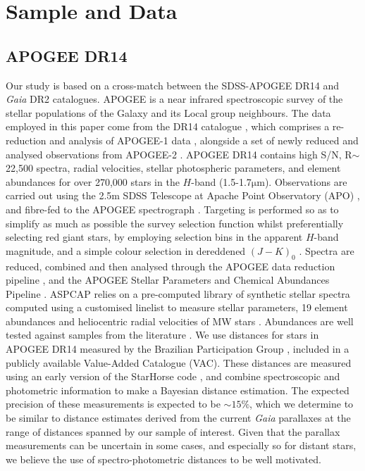 \section{Sample and Data} \label{data}
\subsection{APOGEE DR14}

Our study is based on a cross-match between the SDSS-APOGEE DR14
and \emph{Gaia} DR2 catalogues. APOGEE \citep{2015arXiv150905420M}
is a near infrared spectroscopic survey of the stellar populations
of the Galaxy and its Local group neighbours. The data employed in this paper
come from the DR14 catalogue \citep{2018ApJS..235...42A}, which
comprises a re-reduction and analysis of APOGEE-1 data \citep[from
SDSS-III,][]{2011AJ....142...72E}, alongside a set of newly reduced
and analysed observations from APOGEE-2 \citep[taken as part of
SDSS-IV,][]{2017AJ....154...28B}.  APOGEE DR14 contains
high S/N, R$\sim$22,500 spectra, radial velocities, stellar photospheric
parameters, and element abundances for over 270,000 stars in the
$H$-band (1.5-1.7$\mathrm{\mu m}$).   Observations are carried out
using the 2.5m SDSS Telescope at Apache Point Observatory (APO)
\citep{2006AJ....131.2332G}, and fibre-fed to the APOGEE spectrograph
\citep{2010SPIE.7735E..1CW}. Targeting is performed so as to simplify as much as possible the
survey selection function whilst preferentially selecting red giant
stars, by employing selection bins in the apparent $H$-band magnitude,
and a simple colour selection in dereddened $(J-K)_0$
\citep{2013AJ....146...81Z,2017AJ....154..198Z}. Spectra are reduced, combined and then
analysed through the APOGEE data reduction pipeline
\citep{2015AJ....150..173N}, and the APOGEE Stellar Parameters and
Chemical Abundances Pipeline \citep[ASPCAP,][]{2016AJ....151..144G}.
ASPCAP relies on a pre-computed library of synthetic stellar spectra
\citep{2015AJ....149..181Z} computed using a customised linelist
\citep{2015ApJS..221...24S} to measure stellar parameters, 19 element
abundances and heliocentric radial velocities of MW stars
\citep{2015AJ....150..148H}. Abundances are well tested against
samples from the literature \citep[][in press.]{jonssondr14}.
 We use distances
for stars in APOGEE DR14 measured by the Brazilian Participation
Group \citep[BPG,][]{2016A&A...585A..42S}, included in a publicly
available Value-Added Catalogue (VAC). These distances are measured
using an early version of the StarHorse code \citep{2018MNRAS.476.2556Q},
and combine spectroscopic and photometric information to make a
Bayesian distance estimation. The expected precision of these
measurements is expected to be $\sim 15 \%$, which we determine to
be similar to distance estimates derived from the current \emph{Gaia}
parallaxes at the range of distances spanned by our sample of
interest.  Given that the parallax measurements can be uncertain
in some cases, and especially so for distant stars, we believe the use of spectro-photometric distances to be well motivated.

